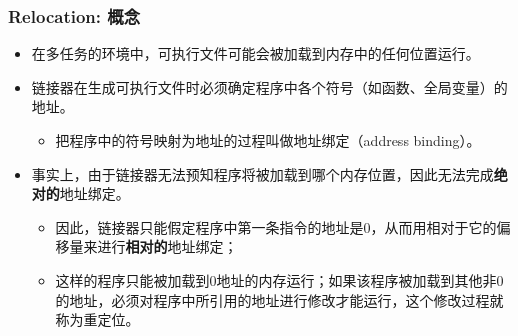 \documentclass[CJKutf8,xcolor=pdftex,dvipsnames,table]{beamer}
\begin{document}
\begin{CJK*}{UTF8}{song}
  \begin{frame}
  \frametitle{Relocation: 概念} \pause
  \begin{itemize}
  \item{在多任务的环境中，可执行文件可能会被加载到内存中的任何位置运行。} \pause
  \item{链接器在生成可执行文件时必须确定程序中各个符号（如函数、全局变量）的地址。} \pause
    \begin{itemize}
    \item{把程序中的符号映射为地址的过程叫做地址绑定（address binding）。} \pause
    \end{itemize}
  \item{事实上，由于链接器无法预知程序将被加载到哪个内存位置，因此无法完成\textbf{绝对的}地址绑定。} \pause
    \begin{itemize}
    \item{因此，链接器只能假定程序中第一条指令的地址是0，从而用相对于它的偏移量来进行\textbf{相对的}地址绑定；} \pause
    \item{这样的程序只能被加载到0地址的内存运行；如果该程序被加载到其他非0的地址，必须对程序中所引用的地址进行修改才能运行，这个修改过程就称为重定位。}
    \end{itemize}
  \end{itemize}
  \end{frame}
  

\end{CJK*}
\end{document}
